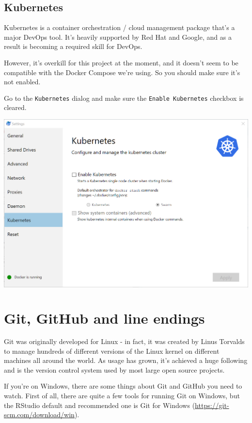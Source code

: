 \documentclass[]{book}
\theoremstyle{definition}
\theoremstyle{definition}
\theoremstyle{definition}
\theoremstyle{remark}
\begin{document}
\hypertarget{kubernetes}{%
\subsection{Kubernetes}\label{kubernetes}}

Kubernetes is a container orchestration / cloud management package
that's a major DevOps tool. It's heavily supported by Red Hat and
Google, and as a result is becoming a required skill for DevOps.

However, it's overkill for this project at the moment, and it doesn't
seem to be compatible with the Docker Compose we're using. So you should
make sure it's not enabled.

Go to the \texttt{Kubernetes} dialog and make sure the
\texttt{Enable\ Kubernetes} checkbox is cleared.

\begin{center}\includegraphics[width=0.9\linewidth]{screenshots/2018-08-26_15_26_22-Kubernetes} \end{center}

\hypertarget{git-github-and-line-endings}{%
\section{Git, GitHub and line
endings}\label{git-github-and-line-endings}}

Git was originally developed for Linux - in fact, it was created by
Linus Torvalds to manage hundreds of different versions of the Linux
kernel on different machines all around the world. As usage has grown,
it's achieved a huge following and is the version control system used by
most large open source projects.

If you're on Windows, there are some things about Git and GitHub you
need to watch. First of all, there are quite a few tools for running Git
on Windows, but the RStudio default and recommended one is Git for
Windows (\url{https://git-scm.com/download/win}).
\end{document}
